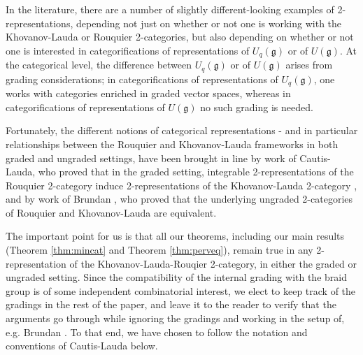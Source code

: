 \documentclass[11pt,reqno]{amsart}
\numberwithin{equation}{section}
\theoremstyle{definition}
\theoremstyle{named}
\newcommand{\fg}{\mathfrak{g}}
\begin{document}
In the literature, there are a number of slightly different-looking examples of 2-representations, depending not just on whether or not one is working with the Khovanov-Lauda or Rouquier 2-categories, but also depending on whether or not one is interested in categorifications of representations of $U_q(\fg)$ or of $U(\fg)$.  At the categorical level, the difference between $U_q(\fg)$ or of $U(\fg)$ arises from grading considerations; in categorifications of representations of  $U_q(\fg)$, one works with categories enriched in graded vector spaces, whereas in categorifications of representations of  $U(\fg)$ no such grading is needed.  

Fortunately, the different notions of categorical representations - and in particular relationships between the Rouquier and Khovanov-Lauda frameworks in both graded and ungraded settings, have been brought in line by work of Cautis-Lauda, who proved that in the graded setting, integrable 2-representations of the Rouquier 2-category induce 2-representations of the Khovanov-Lauda 2-category \cite{CaLa}, and by work of Brundan \cite{Brundandef}, who proved that the underlying ungraded 2-categories of Rouquier and Khovanov-Lauda are equivalent.  

The important point for us is that all our theorems, including our main results (Theorem \ref{thm:mincat} and Theorem \ref{thm:perveq}), remain true in any 2-representation of the Khovanov-Lauda-Rouqier 2-category, in either the graded or ungraded setting.
Since the compatibility of the internal grading with the braid group is of some independent combinatorial interest, we elect to keep track of the gradings in the rest of the paper, and leave it to the reader to verify that the arguments go through while ignoring the gradings and working in the setup of, e.g. Brundan \cite{Brundandef}.  To that end, we have chosen to follow the notation and conventions of Cautis-Lauda below.
\end{document}
